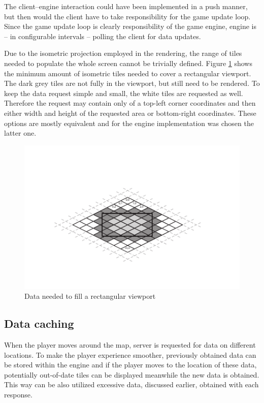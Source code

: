 \documentclass[11pt,oneside, final]{fithesis2}
\begin{document}
The client--engine interaction could have been implemented in a push manner, but then would the client have to take responsibility for the game update loop. Since the game update loop is clearly responsibility of the game engine\cite{gregory}, engine is -- in configurable intervals -- polling the client for data updates.

Due to the isometric projection employed in the rendering, the range of tiles needed to populate the whole screen cannot be trivially defined. Figure \ref{isodata} shows the minimum amount of isometric tiles needed to cover a rectangular viewport. The dark grey tiles are not fully in the viewport, but still need to be rendered. To keep the data request simple and small, the white tiles are requested as well. Therefore the request may contain only of a top-left corner coordinates and then either width and height of the requested area or bottom-right coordinates. These options are mostly equivalent and for the engine implementation was chosen the latter one.

\begin{figure}[h]
	\centering
	\includegraphics[clip=true,trim=20mm 17mm 20mm 23mm]{thesis-isodata}
	\caption{Data needed to fill a rectangular viewport}
	\label{isodata}
\end{figure}

\subsection{Data caching}
When the player moves around the map, server is requested for data on different locations. To make the player experience smoother, previously obtained data can be stored within the engine and if the player moves to the location of these data, potentially out-of-date tiles can be displayed meanwhile the new data is obtained. This way can be also utilized excessive data, discussed earlier, obtained with each response.
\end{document}
